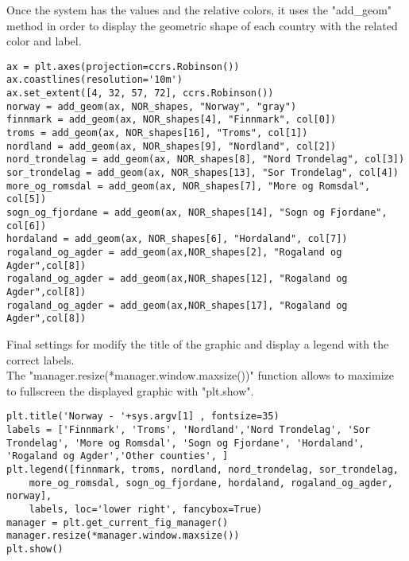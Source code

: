 Once the system has the values and the relative colors, it uses the "add\_geom" method in order to display the geometric shape of each country with the related color and label. 
\begin{lstlisting}
ax = plt.axes(projection=ccrs.Robinson())
ax.coastlines(resolution='10m')
ax.set_extent([4, 32, 57, 72], ccrs.Robinson())	
norway = add_geom(ax, NOR_shapes, "Norway", "gray")
finnmark = add_geom(ax, NOR_shapes[4], "Finnmark", col[0])
troms = add_geom(ax, NOR_shapes[16], "Troms", col[1])
nordland = add_geom(ax, NOR_shapes[9], "Nordland", col[2])
nord_trondelag = add_geom(ax, NOR_shapes[8], "Nord Trondelag", col[3])
sor_trondelag = add_geom(ax, NOR_shapes[13], "Sor Trondelag", col[4])
more_og_romsdal = add_geom(ax, NOR_shapes[7], "More og Romsdal", col[5])
sogn_og_fjordane = add_geom(ax, NOR_shapes[14], "Sogn og Fjordane", col[6])
hordaland = add_geom(ax, NOR_shapes[6], "Hordaland", col[7])
rogaland_og_agder = add_geom(ax,NOR_shapes[2], "Rogaland og Agder",col[8])
rogaland_og_agder = add_geom(ax,NOR_shapes[12], "Rogaland og Agder",col[8])
rogaland_og_agder = add_geom(ax,NOR_shapes[17], "Rogaland og Agder",col[8])
\end{lstlisting}

Final settings for modify the title of the graphic and display a legend with the correct labels. \\
The "manager.resize(*manager.window.maxsize())" function allows to maximize to fullscreen the displayed graphic with "plt.show".
\begin{lstlisting}
plt.title('Norway - '+sys.argv[1] , fontsize=35)
labels = ['Finnmark', 'Troms', 'Nordland','Nord Trondelag', 'Sor Trondelag', 'More og Romsdal',	'Sogn og Fjordane', 'Hordaland', 	'Rogaland og Agder','Other counties', ]
plt.legend([finnmark, troms, nordland, nord_trondelag, sor_trondelag, 
	more_og_romsdal, sogn_og_fjordane, hordaland, rogaland_og_agder, norway], 
	labels, loc='lower right', fancybox=True)
manager = plt.get_current_fig_manager()
manager.resize(*manager.window.maxsize())
plt.show()


\end{lstlisting}
